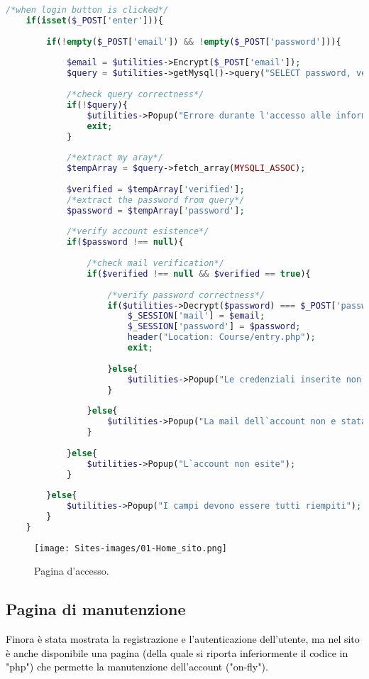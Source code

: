 \begin{lstlisting}[language=php]
	/*when login button is clicked*/
	if(isset($_POST['enter'])){
		
		if(!empty($_POST['email']) && !empty($_POST['password'])){
			
			$email = $utilities->Encrypt($_POST['email']);
			$query = $utilities->getMysql()->query("SELECT password, verified FROM user_table1 WHERE (email = '{$email}')");
			
			/*check query correctness*/
			if(!$query){
				$utilities->Popup("Errore durante l'accesso alle informazioni");
				exit;
			}
			
			/*extract my aray*/
			$tempArray = $query->fetch_array(MYSQLI_ASSOC);
			
			$verified = $tempArray['verified'];
			/*extract the password from query*/
			$password = $tempArray['password'];
			
			/*verify account esistence*/  
			if($password !== null){
				
				/*check mail verification*/
				if($verified !== null && $verified == true){
					
					/*verify password correctness*/
					if($utilities->Decrypt($password) === $_POST['password']){
						$_SESSION['mail'] = $email;
						$_SESSION['password'] = $password;
						header("Location: Course/entry.php");
						exit;
						
					}else{
						$utilities->Popup("Le credenziali inserite non sono corrette");
					}
					
				}else{
					$utilities->Popup("La mail dell`account non e stata verificata.");
				}
				
			}else{
				$utilities->Popup("L`account non esite");
			}
			
		}else{
			$utilities->Popup("I campi devono essere tutti riempiti");
		}
	}
\end{lstlisting}

\begin{figure}[H]
	\begin{center}
		\texttt{[image: Sites-images/01-Home\_sito.png]}
		\caption{Pagina d'accesso.}
	\end{center}
\end{figure}

\subsection{Pagina di manutenzione}
\raggedright
\textcolor{black}{Finora è stata mostrata la registrazione e l'autenticazione dell'utente, ma nel sito è anche disponibile una pagina (della quale si riporta inferiormente il codice in "php") che permette la manutenzione dell'account ("on-fly").}\\

